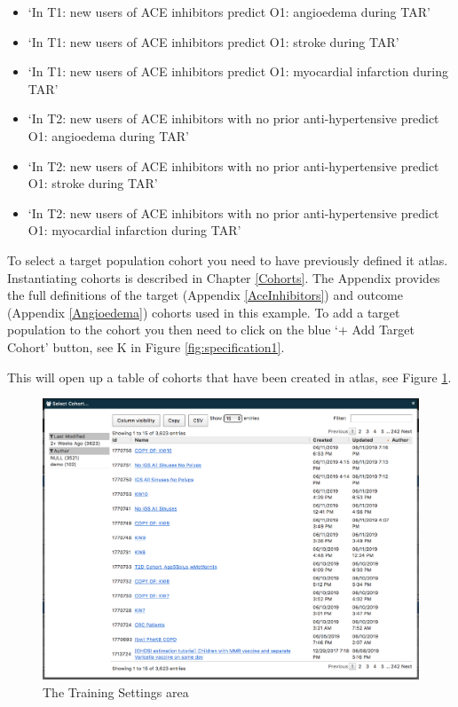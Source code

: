 \documentclass[11pt]{book}
\providecommand{\tightlist}{%
  \setlength{\itemsep}{0pt}\setlength{\parskip}{0pt}}
\begin{document}
\begin{itemize}
\tightlist
\item
  `In T1: new users of ACE inhibitors predict O1: angioedema during TAR'
\item
  `In T1: new users of ACE inhibitors predict O1: stroke during TAR'
\item
  `In T1: new users of ACE inhibitors predict O1: myocardial infarction
  during TAR'
\item
  `In T2: new users of ACE inhibitors with no prior anti-hypertensive
  predict O1: angioedema during TAR'
\item
  `In T2: new users of ACE inhibitors with no prior anti-hypertensive
  predict O1: stroke during TAR'
\item
  `In T2: new users of ACE inhibitors with no prior anti-hypertensive
  predict O1: myocardial infarction during TAR'
\end{itemize}

To select a target population cohort you need to have previously defined
it atlas. Instantiating cohorts is described in Chapter \ref{Cohorts}.
The Appendix provides the full definitions of the target (Appendix
\ref{AceInhibitors}) and outcome (Appendix \ref{Angioedema}) cohorts
used in this example. To add a target population to the cohort you then
need to click on the blue `+ Add Target Cohort' button, see K in Figure
\ref{fig:specification1}.

This will open up a table of cohorts that have been created in atlas,
see Figure \ref{fig:figure2k}.

\begin{figure}
\includegraphics[width=1\linewidth]{images/PatientLevelPrediction/atlasImplementation/target_pop_cohort_table} \caption{The Training Settings area}\label{fig:figure2k}
\end{figure}
\end{document}
